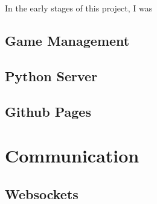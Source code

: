 \cite{SpriteSheet}
In the early stages of this project, I was 


\subsection{Game Management}


\subsection{Python Server}


\subsection{Github Pages}


\section{Communication}



\subsection{Websockets}


